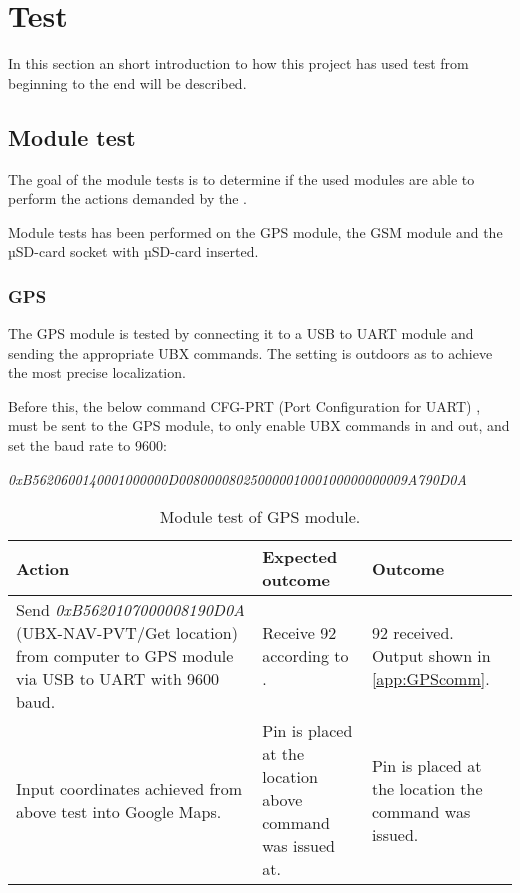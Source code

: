 
\chapter{Test}
In this section an short introduction to how this project has used test from beginning to the end will be described.

\section{Module test}
The goal of the module tests is to determine if the used modules are able to perform the actions demanded by the .

Module tests has been performed on the \GPS GPS module, the \SARA GSM module and the \SDsock µSD-card socket with µSD-card inserted.

\subsection{GPS \GPS}
The GPS module is tested by connecting it to a USB to UART module and sending the appropriate UBX commands. The setting is outdoors as to achieve the most precise localization.

Before this, the below command CFG-PRT (Port Configuration for UART) \cite[p.~119-120]{NEO7_proto}, must be sent to the GPS module, to only enable UBX commands in and out, and set the baud rate to \num{9600}:

\noindent
\textit{0xB5620600140001000000D00800008025000001000100000000009A790D0A}

\begin{table}[H]
	\centering
	\begin{tabularx}{\textwidth}{p{4.3cm} X X}
		\toprule
		\textbf{Action} & \textbf{Expected outcome} & \textbf{Outcome} \\
		\midrule
		Send \textit{0xB5620107000008190D0A} (UBX-NAV-PVT/Get location) from computer to GPS module via USB to UART with \num{9600} baud. & Receive \SI{92}{\byte} according to \cite[p.~160-161]{NEO7_proto}. & \SI{92}{\byte} received. Output shown in \cref{app:GPScomm}. \\
		\midrule
		Input coordinates achieved from above test into Google Maps. & Pin is placed at the location above command was issued at. & Pin is placed at the location the command was issued. \\
		\bottomrule
	\end{tabularx}
	\caption{Module test of \GPS GPS module.}
	\label{AT:modGPS}
\end{table}

